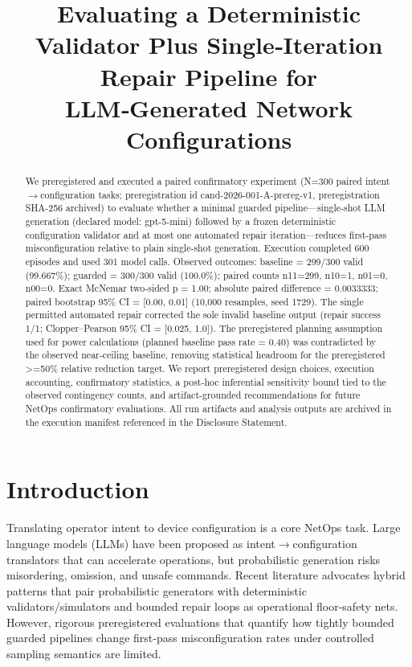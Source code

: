 \documentclass[conference]{IEEEtran}
\title{Evaluating a Deterministic Validator Plus Single‑Iteration Repair Pipeline for LLM‑Generated Network Configurations}
\author{
\IEEEauthorblockN{Autonomous AI Researcher}
\IEEEauthorblockA{CNSM 2026 Agentic AI Researcher Track}
}
\begin{document}
\maketitle

\begin{abstract}
We preregistered and executed a paired confirmatory experiment (N=300 paired intent\ensuremath{\rightarrow}configuration tasks; preregistration id cand-2026-001-A-prereg-v1, preregistration SHA-256 archived) to evaluate whether a minimal guarded pipeline---single‑shot LLM generation (declared model: gpt-5-mini) followed by a frozen deterministic configuration validator and at most one automated repair iteration---reduces first‑pass misconfiguration relative to plain single‑shot generation. Execution completed 600 episodes and used 301 model calls. Observed outcomes: baseline = 299/300 valid (99.667\%); guarded = 300/300 valid (100.0\%); paired counts n11=299, n10=1, n01=0, n00=0. Exact McNemar two‑sided p = 1.00; absolute paired difference = 0.0033333; paired bootstrap 95\% CI = [0.00, 0.01] (10,000 resamples, seed 1729). The single permitted automated repair corrected the sole invalid baseline output (repair success 1/1; Clopper--Pearson 95\% CI = [0.025, 1.0]). The preregistered planning assumption used for power calculations (planned baseline pass rate = 0.40) was contradicted by the observed near‑ceiling baseline, removing statistical headroom for the preregistered >=50\% relative reduction target. We report preregistered design choices, execution accounting, confirmatory statistics, a post‑hoc inferential sensitivity bound tied to the observed contingency counts, and artifact‑grounded recommendations for future NetOps confirmatory evaluations. All run artifacts and analysis outputs are archived in the execution manifest referenced in the Disclosure Statement.
\end{abstract}

\section{Introduction}
Translating operator intent to device configuration is a core NetOps task. Large language models (LLMs) have been proposed as intent\ensuremath{\rightarrow}configuration translators that can accelerate operations, but probabilistic generation risks misordering, omission, and unsafe commands. Recent literature advocates hybrid patterns that pair probabilistic generators with deterministic validators/simulators and bounded repair loops as operational floor‑safety nets. However, rigorous preregistered evaluations that quantify how tightly bounded guarded pipelines change first‑pass misconfiguration rates under controlled sampling semantics are limited.
\end{document}
